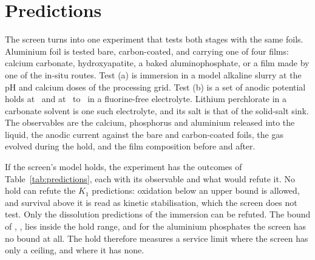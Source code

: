 \section{Predictions}\label{sec:predictions}

The screen turns into one experiment that tests both stages with the same foils. %
Aluminium foil is tested bare, carbon-coated, and carrying one of four films: calcium carbonate, hydroxyapatite, a baked aluminophosphate, or a film made by one of the in-situ routes. %
Test (a) is immersion in a model alkaline slurry at the pH and calcium doses of the processing grid. %
Test (b) is a set of anodic potential holds at \NumClassLo\ and at \NumHoldLow\ to \NumHoldHigh\ in a fluorine-free electrolyte. %
Lithium perchlorate in a carbonate solvent is one such electrolyte, and its salt is that of the solid-salt sink. %
The observables are the calcium, phosphorus and aluminium released into the liquid, the anodic current against the bare and carbon-coated foils, the gas evolved during the hold, and the film composition before and after. %

If the screen's model holds, the experiment has the outcomes of Table~\ref{tab:predictions}, each with its observable and what would refute it. %
No hold can refute the $K_1$ predictions: oxidation below an upper bound is allowed, and survival above it is read as kinetic stabilisation, which the screen does not test. %
Only the dissolution predictions of the immersion can be refuted. %
The bound of , \NumPyroOnset, lies inside the hold range, and for the aluminium phosphates the screen has no bound at all. %
The hold therefore measures a service limit where the screen has only a ceiling, and where it has none. %

